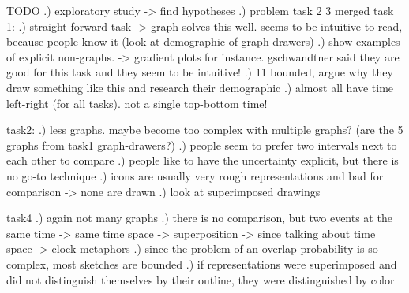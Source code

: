 TODO
.) exploratory study -> find hypotheses 
.) problem task 2 3 merged
task 1:
.) straight forward task -> graph solves this well. seems to be intuitive to read, because people know it (look at demographic of graph drawers)
.) show examples of explicit non-graphs. -> gradient plots for instance. gschwandtner said they are good for this task and they seem to be intuitive!
.) 11 bounded, argue why they draw something like this and research their demographic
.) almost all have time left-right (for all tasks). not a single top-bottom time!

task2:
.) less graphs. maybe become too complex with multiple graphs? (are the 5 graphs from task1 graph-drawers?)
.) people seem to prefer two intervals next to each other to compare
.) people like to have the uncertainty explicit, but there is no go-to technique
.) icons are usually very rough representations and bad for comparison -> none are drawn
.) look at superimposed drawings

task4
.) again not many graphs
.) there is no comparison, but two events at the same time -> same time space -> superposition -> since talking about time space -> clock metaphors
.) since the problem of an overlap probability is so complex, most sketches are bounded
.) if representations were superimposed and did not distinguish themselves by their outline, they were distinguished by color
